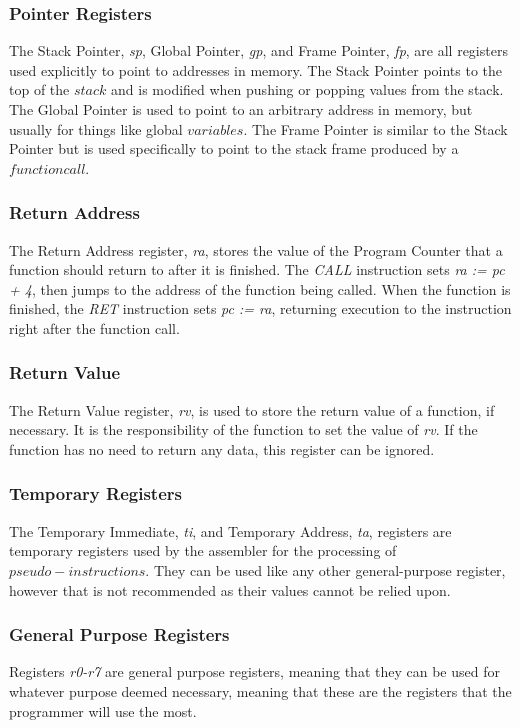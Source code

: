 \subsubsection{Pointer Registers}
The Stack Pointer, \textit{sp}, Global Pointer, \textit{gp}, and Frame Pointer, \textit{fp}, are all registers used explicitly to point to addresses in memory.
The Stack Pointer points to the top of the $stack$ and is modified when pushing or popping values from the stack.
The Global Pointer is used to point to an arbitrary address in memory, but usually for things like global $variables$.
The Frame Pointer is similar to the Stack Pointer but is used specifically to point to the stack frame produced by a $function call$. 

\subsubsection{Return Address}
The Return Address register, \textit{ra}, stores the value of the Program Counter that a function should return to after it is finished.
The \textit{CALL} instruction sets \textit{ra := pc + 4}, then jumps to the address of the function being called.
When the function is finished, the \textit{RET} instruction sets \textit{pc := ra}, returning execution to the instruction right after the function call.

\subsubsection{Return Value}
The Return Value register, \textit{rv}, is used to store the return value of a function, if necessary.
It is the responsibility of the function to set the value of \textit{rv}.
If the function has no need to return any data, this register can be ignored.

\subsubsection{Temporary Registers}
The Temporary Immediate, \textit{ti}, and Temporary Address, \textit{ta}, registers are temporary registers used by the assembler for the processing of $pseudo-instructions$.
They can be used like any other general-purpose register, however that is not recommended as their values cannot be relied upon.

\subsubsection{General Purpose Registers}
Registers \textit{r0-r7} are general purpose registers, meaning that they can be used for whatever purpose deemed necessary, meaning that these are the registers that the programmer will use the most.
